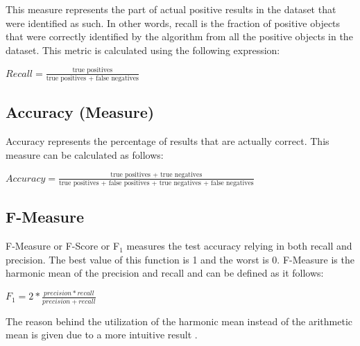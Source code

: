 This measure represents the part of actual positive results in the dataset that
were identified as such. In other words, recall is the fraction of positive
objects that were correctly identified by the algorithm from all the positive objects in the
dataset. This metric is calculated using the following expression:

\begin{center}
\Large
\begin{math}
Recall = \frac{\text{true positives}}{\text{true positives + false negatives}}
\end{math}
\normalsize
\end{center}

\subsection{Accuracy (Measure)}

Accuracy represents the percentage of results that are actually correct. This
measure can be calculated as follows:

\begin{center}
\Large
\begin{math}
Accuracy = \frac{\text{true positives + true negatives}}{\text{true positives + false positives + true negatives + false negatives}}
\end{math}
\normalsize
\end{center}


\subsection{F-Measure}

F-Measure or F-Score or F\begin{math}_1 \end{math} measures the test accuracy relying in both recall
and precision. The best value of this function is 1 and the worst is 0.
F-Measure is the harmonic mean of the precision and recall and can be defined as
it follows:

\begin{center}
\Large
\begin{math}
F_1 = 2 * \frac{precision*recall}{precision+recall}
\end{math}
\normalsize
\end{center}

The reason behind the utilization of the harmonic mean instead of the arithmetic mean
is given due to a more intuitive result \cite{sasaki2007truth}.



